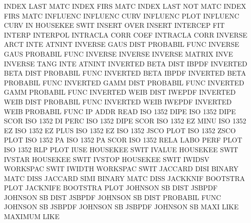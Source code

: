 INDEX    LAST MATC                      INDEX    FIRS MATC
INDEX    LAST NOT  MATC                 INDEX    FIRS MATC
INFLUENC                                INFLUENC CURV
INFLUENC PLOT                           INFLUENC CURV
IN                                      HOUSEKEE SWIT
INSERT   OVER                           INSERT
INTERCEP                                FIT
INTERP                                  INTERPOL
INTRACLA CORR COEF                      INTRACLA CORR
INVERSE  ARCT INTE                      ATNINT
INVERSE  GAUS DIST                      PROBABIL FUNC
INVERSE  GAUS                           PROBABIL FUNC
INVERSE                                 INVERSE
INVERSE                                 MATRIX   INVE
INVERSE  TANG INTE                      ATNINT
INVERTED BETA DIST                      IBPDF
INVERTED BETA DIST                      PROBABIL FUNC
INVERTED BETA                           IBPDF
INVERTED BETA                           PROBABIL FUNC
INVERTED GAMM DIST                      PROBABIL FUNC
INVERTED GAMM                           PROBABIL FUNC
INVERTED WEIB DIST                      IWEPDF
INVERTED WEIB DIST                      PROBABIL FUNC
INVERTED WEIB                           IWEPDF
INVERTED WEIB                           PROBABIL FUNC
IP       ADDR                           READ
ISO      1352 DIPE                      ISO      1352 DIPE SCOR
ISO      1352 DI   PERC                 ISO      1352 DIPE SCOR
ISO      1352 EZ   MINU                 ISO      1352 EZ
ISO      1352 EZ   PLUS                 ISO      1352 EZ
ISO      1352 JSCO PLOT                 ISO      1352 ZSCO PLOT
ISO      1352 PA                        ISO      1352 PA   SCOR
ISO      1352 RELA LABO PERF PLOT       ISO      1352 RLP  PLOT
IUSE                                    HOUSEKEE SWIT
IVALUE                                  HOUSEKEE SWIT
IVSTAR                                  HOUSEKEE SWIT
IVSTOP                                  HOUSEKEE SWIT
IWIDSV                                  WORKSPAC SWIT
IWIDTH                                  WORKSPAC SWIT
JACCARD  DISI                           BINARY   MATC DISS
JACCARD  SIMI                           BINARY   MATC DISS
JACKKNIF                                BOOTSTRA PLOT
JACKNIFE                                BOOTSTRA PLOT
JOHNSON  SB   DIST                      JSBPDF
JOHNSON  SB   DIST                      JSBPDF
JOHNSON  SB   DIST                      PROBABIL FUNC
JOHNSON  SB                             JSBPDF
JOHNSON  SB                             JSBPDF
JOHNSON  SB   MAXI LIKE                 MAXIMUM  LIKE
